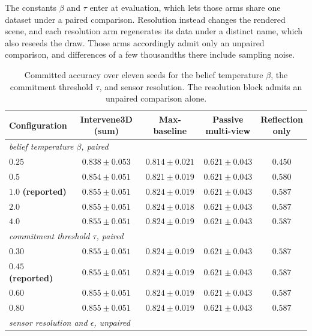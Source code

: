 \documentclass{article} %
\theoremstyle{defstyle}
\theoremstyle{plain}
\begin{document}
The constants $\beta$ and $\tau$ enter at evaluation, which lets those arms share one dataset
under a paired comparison. Resolution instead changes the rendered scene, and each resolution
arm regenerates its data under a distinct name, which also reseeds the draw. Those arms
accordingly admit only an unpaired comparison, and differences of a few thousandths there
include sampling noise.

\begin{table}[htb]
\caption{Committed accuracy over eleven seeds for the belief temperature $\beta$, the commitment threshold $\tau$, and sensor resolution. The resolution block admits an unpaired comparison alone.}
\label{tab:supp-hyper}
\begin{center}
\footnotesize \setlength{\tabcolsep}{4pt}
\begin{tabular}{lcccc}
\toprule
\textbf{Configuration} & \textbf{Intervene3D (sum)} & \textbf{Max-baseline} &
\shortstack{\textbf{Passive}\\\textbf{multi-view}} & \shortstack{\textbf{Reflection}\\\textbf{only}} \\
\midrule
\multicolumn{5}{l}{\emph{belief temperature $\beta$, paired}} \\
$0.25$ & $0.838 \pm 0.053$ & $0.814 \pm 0.021$ & $0.621 \pm 0.043$ & $0.450$ \\
$0.5$  & $0.854 \pm 0.051$ & $0.821 \pm 0.019$ & $0.621 \pm 0.043$ & $0.580$ \\
$\mathbf{1.0}$ \textbf{(reported)} & $\mathbf{0.855 \pm 0.051}$ & $0.824 \pm 0.019$ & $0.621 \pm 0.043$ & $0.587$ \\
$2.0$  & $0.855 \pm 0.051$ & $0.824 \pm 0.018$ & $0.621 \pm 0.043$ & $0.587$ \\
$4.0$  & $0.855 \pm 0.051$ & $0.824 \pm 0.019$ & $0.621 \pm 0.043$ & $0.587$ \\
\midrule
\multicolumn{5}{l}{\emph{commitment threshold $\tau$, paired}} \\
$0.30$ & $0.855 \pm 0.051$ & $0.824 \pm 0.019$ & $0.621 \pm 0.043$ & $0.587$ \\
$\mathbf{0.45}$ \textbf{(reported)} & $\mathbf{0.855 \pm 0.051}$ & $0.824 \pm 0.019$ & $0.621 \pm 0.043$ & $0.587$ \\
$0.60$ & $0.855 \pm 0.051$ & $0.824 \pm 0.019$ & $0.621 \pm 0.043$ & $0.587$ \\
$0.80$ & $0.855 \pm 0.051$ & $0.824 \pm 0.019$ & $0.621 \pm 0.043$ & $0.587$ \\
\midrule
\multicolumn{5}{l}{\emph{sensor resolution and $\epsilon$, unpaired}} \\

\end{tabular}
\end{center}
\end{table}
\end{document}
